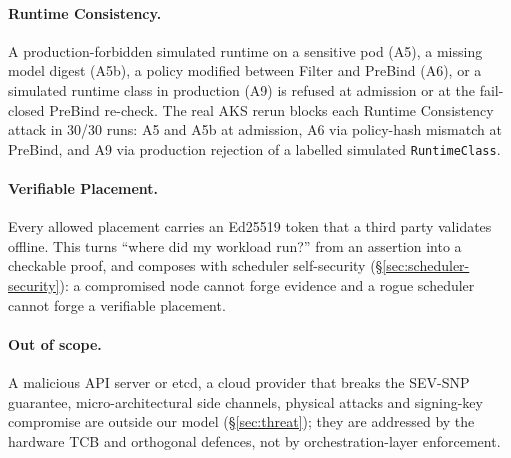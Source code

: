 \paragraph{Runtime Consistency.}
A production-forbidden simulated runtime on a sensitive pod (A5), a missing
model digest (A5b), a policy modified between Filter and PreBind (A6), or a
simulated runtime class in production (A9) is refused at admission or at the
fail-closed PreBind re-check. The real AKS rerun blocks each Runtime Consistency
attack in 30/30 runs: A5 and A5b at admission, A6 via policy-hash mismatch at
PreBind, and A9 via production rejection of a labelled simulated
\texttt{RuntimeClass}.

\paragraph{Verifiable Placement.}
Every allowed placement carries an Ed25519 token that a third party validates
offline. This turns ``where did my workload run?'' from an assertion into a
checkable proof, and composes with scheduler self-security
(\S\ref{sec:scheduler-security}): a compromised node cannot forge evidence and a
rogue scheduler cannot forge a verifiable placement.

\paragraph{Out of scope.}
A malicious API server or etcd, a cloud provider that breaks the SEV-SNP
guarantee, micro-architectural side channels, physical attacks and signing-key
compromise are outside our model (\S\ref{sec:threat}); they are addressed by the
hardware TCB and orthogonal defences, not by orchestration-layer enforcement.

